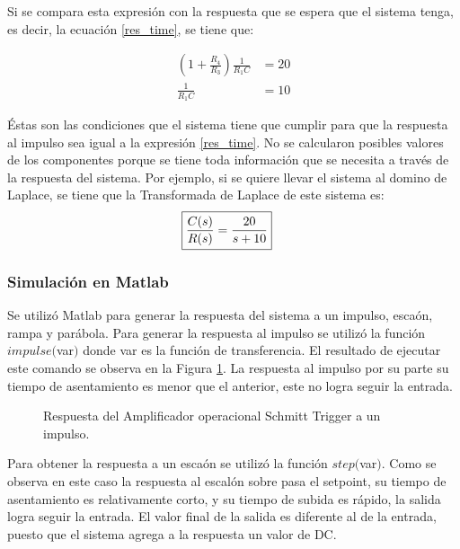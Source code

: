 \documentclass[journal]{IEEEtran}
\begin{document}
Si se compara esta expresi\'on con la respuesta que se 
espera que el sistema tenga, es decir, la ecuación \ref{res_time}, se tiene que: 

\begin{align}
	\label{equAmpl} \left( 1 + \frac{R_4}{R_3} \right)
	\frac{1}{R_1 C} & = 20 \\ 
	\label{equTao} 	\frac{1}{R_1 C} &=  10 
\end{align}

\'Estas son las condiciones que el sistema tiene que cumplir 
para que la respuesta al impulso sea igual a la expresi\'on 
\ref{res_time}. No se calcularon posibles valores de los 
componentes porque se tiene toda informaci\'on que se 
necesita a trav\'es de la respuesta del sistema. 
Por ejemplo, si se
quiere llevar el sistema al domino de Laplace, se tiene 
que la Transformada de Laplace de este sistema es: 
\begin{align}
	\label{tf_primerOrden} \Aboxed {\frac{C(s)}{R(s)} 
	& = \frac{20}{s + 10}}
\end{align}

\subsubsection*{Simulaci\'on en Matlab} Se utiliz\'o Matlab 
para generar la respuesta del sistema a un impulso, esca\'on,
rampa y par\'abola. Para generar la respuesta al impulso se 
utiliz\'o la funci\'on $impulse($var$)$ donde var es la 
funci\'on de transferencia. El resultado de ejecutar este 
comando se observa en la Figura \ref{res_impulso}. 
La respuesta al impulso por su parte su tiempo de
asentamiento es menor que el
anterior, este no logra seguir la entrada.\\

\begin{figure}[h]
\caption{Respuesta del Amplificador 
operacional Schmitt Trigger a un impulso.}
\label{res_impulso}
\end{figure}

Para obtener la respuesta a un esca\'on se utiliz\'o la
funci\'on $step($var$)$. Como se observa en este caso la
respuesta al escal\'on sobre pasa el setpoint, su
tiempo de asentamiento es relativamente corto, y su tiempo 
de subida es rápido, la salida logra seguir la entrada.
El valor final de la salida es diferente al de la entrada, 
puesto que el sistema agrega a la respuesta un valor 
de DC.\\
\end{document}
